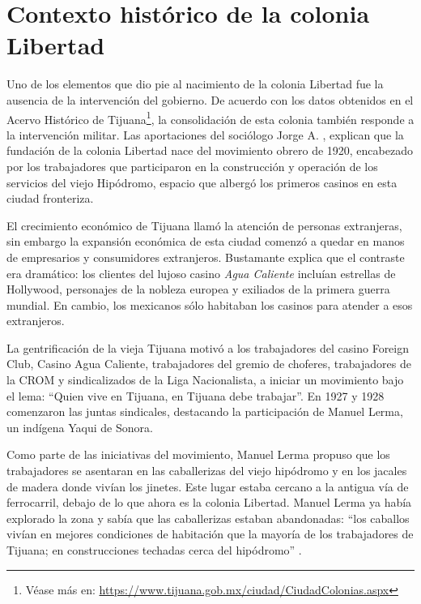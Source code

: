 \documentclass[
  spanish,
  11pt,
  a4paper,
]{scrbook}
\begin{document}
\section*{Contexto histórico de la colonia
Libertad}\label{contexto-histuxf3rico-de-la-colonia-libertad}


Uno de los elementos que dio pie al nacimiento de la colonia Libertad
fue la ausencia de la intervención del gobierno. De acuerdo con los
datos obtenidos en el Acervo Histórico de Tijuana\footnote{Véase más en:
  \url{https://www.tijuana.gob.mx/ciudad/CiudadColonias.aspx}}, la
consolidación de esta colonia también responde a la intervención
militar. Las aportaciones del sociólogo Jorge A.
\textcite{Bustamante1990}, explican que la fundación de la colonia
Libertad nace del movimiento obrero de 1920, encabezado por los
trabajadores que participaron en la construcción y operación de los
servicios del viejo Hipódromo, espacio que albergó los primeros casinos
en esta ciudad fronteriza.

El crecimiento económico de Tijuana llamó la atención de personas
extranjeras, sin embargo la expansión económica de esta ciudad comenzó a
quedar en manos de empresarios y consumidores extranjeros. Bustamante
explica que el contraste era dramático: los clientes del lujoso casino
\emph{Agua Caliente} incluían estrellas de Hollywood, personajes de la
nobleza europea y exiliados de la primera guerra mundial. En cambio, los
mexicanos sólo habitaban los casinos para atender a esos extranjeros.

La gentrificación de la vieja Tijuana motivó a los trabajadores del
casino Foreign Club, Casino Agua Caliente, trabajadores del gremio de
choferes, trabajadores de la CROM y sindicalizados de la Liga
Nacionalista, a iniciar un movimiento bajo el lema: ``Quien vive en
Tijuana, en Tijuana debe trabajar''. En 1927 y 1928 comenzaron las
juntas sindicales, destacando la participación de Manuel Lerma, un
indígena Yaqui de Sonora.

Como parte de las iniciativas del movimiento, Manuel Lerma propuso que
los trabajadores se asentaran en las caballerizas del viejo hipódromo y
en los jacales de madera donde vivían los jinetes. Este lugar estaba
cercano a la antigua vía de ferrocarril, debajo de lo que ahora es la
colonia Libertad. Manuel Lerma ya había explorado la zona y sabía que
las caballerizas estaban abandonadas: ``los caballos vivían en mejores
condiciones de habitación que la mayoría de los trabajadores de Tijuana;
en construcciones techadas cerca del hipódromo''
\autocite[12]{Bustamante1990}.
\end{document}
